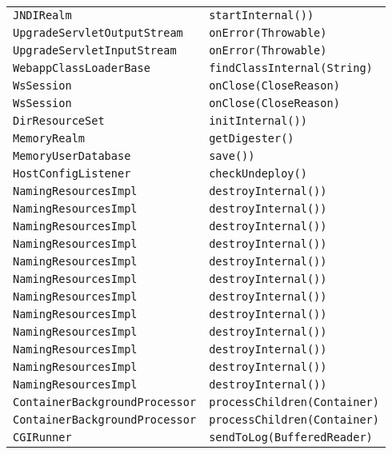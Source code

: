 \begin{center}
\begin{longtable}{ll}
\lstinline/JNDIRealm/&{\lstinline/startInternal())/}\\
\lstinline/UpgradeServletOutputStream/&{\lstinline/onError(Throwable)/}\\
\lstinline/UpgradeServletInputStream/&{\lstinline/onError(Throwable)/}\\
\lstinline/WebappClassLoaderBase/&{\lstinline/findClassInternal(String)/}\\
\lstinline/WsSession/&{\lstinline/onClose(CloseReason)/}\\
\lstinline/WsSession/&{\lstinline/onClose(CloseReason)/}\\
\lstinline/DirResourceSet/&{\lstinline/initInternal())/}\\
\lstinline/MemoryRealm/&{\lstinline/getDigester()/}\\
\lstinline/MemoryUserDatabase/&{\lstinline/save())/}\\
\lstinline/HostConfigListener/&{\lstinline/checkUndeploy()/}\\
\lstinline/NamingResourcesImpl/&{\lstinline/destroyInternal())/}\\
\lstinline/NamingResourcesImpl/&{\lstinline/destroyInternal())/}\\
\lstinline/NamingResourcesImpl/&{\lstinline/destroyInternal())/}\\
\lstinline/NamingResourcesImpl/&{\lstinline/destroyInternal())/}\\
\lstinline/NamingResourcesImpl/&{\lstinline/destroyInternal())/}\\
\lstinline/NamingResourcesImpl/&{\lstinline/destroyInternal())/}\\
\lstinline/NamingResourcesImpl/&{\lstinline/destroyInternal())/}\\
\lstinline/NamingResourcesImpl/&{\lstinline/destroyInternal())/}\\
\lstinline/NamingResourcesImpl/&{\lstinline/destroyInternal())/}\\
\lstinline/NamingResourcesImpl/&{\lstinline/destroyInternal())/}\\
\lstinline/NamingResourcesImpl/&{\lstinline/destroyInternal())/}\\
\lstinline/NamingResourcesImpl/&{\lstinline/destroyInternal())/}\\
\lstinline/ContainerBackgroundProcessor/&{\lstinline/processChildren(Container)/}\\
\lstinline/ContainerBackgroundProcessor/&{\lstinline/processChildren(Container)/}\\
\lstinline/CGIRunner/&{\lstinline/sendToLog(BufferedReader)/}\\

\end{longtable}
\end{center}
